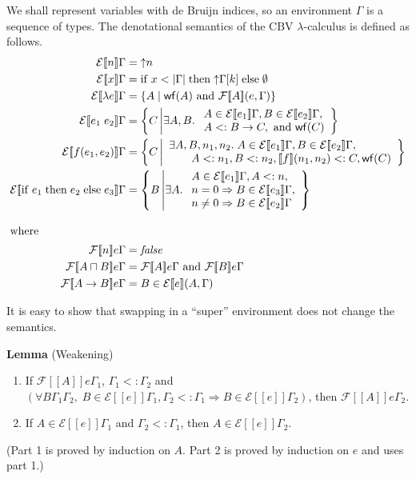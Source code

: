 \documentclass{article}
\newcommand{\app}[0]{\;}
\newcommand{\IF}[0]{\mathrm{if}\;}
\newcommand{\THEN}[0]{\;\mathrm{then}\;}
\newcommand{\ELSE}[0]{\;\mathrm{else}\;}
\newcommand{\SEM}[1]{[\![ #1 ]\!]}
\newcommand{\ESEM}[1]{\mathcal{E}\SEM{#1}}
\newcommand{\FSEM}[1]{\mathcal{F}\SEM{#1}}
\newcommand{\WF}[1]{\mathsf{wf}(#1)}
\newcommand{\UP}[1]{\mathord{\uparrow} #1}
\begin{document}
We shall represent variables with de Bruijn indices, so an environment
$\Gamma$ is a sequence of types.  The denotational semantics of the CBV
$\lambda$-calculus is defined as follows.
\begin{align*}
  \ESEM{n}\Gamma &= \UP{n} \\
  \ESEM{x}\Gamma &=  \IF x < |\Gamma| \THEN \UP{\Gamma[k]} \ELSE \emptyset \\
  \ESEM{\lambda e }\Gamma &= \{ A \mid \WF{A} \text{ and } \FSEM{A}(e,\Gamma) \} \\
  \ESEM{e_1\app e_2}\Gamma &= \left\{ C\, \middle| \exists A,B.\;
      \begin{array}{l}
      A \in \ESEM{e_1}\Gamma,
      B \in \ESEM{e_2}\Gamma,\\
      A <: B \to C, \text{ and } \WF{C}
      \end{array}
        \right\} \\
  \ESEM{f(e_1,e_2)}\Gamma &=
      \left\{ C\, \middle| \begin{array}{l}
       \exists A,B,n_1,n_2.\; A \in \ESEM{e_1}\Gamma, B \in \ESEM{e_2}\Gamma,\\
      \qquad A <: n_1, B <: n_2, \SEM{f}(n_1,n_2) <: C, \WF{C} 
      \end{array} \right\} \\
  \ESEM{\IF e_1 \THEN e_2 \ELSE e_3}\Gamma &=
    \left\{ B\, \middle| \exists A.\;
    \begin{array}{l}A \in \ESEM{e_1}\Gamma, A <: n,\\
           n = 0 \Rightarrow B \in \ESEM{e_3}\Gamma,\\
           n \neq 0 \Rightarrow B \in \ESEM{e_2}\Gamma
    \end{array}
    \right\}
    \\[2ex]
    \intertext{where}
   \FSEM{n}e\Gamma &= \mathit{false} \\
   \FSEM{A \sqcap B}e \Gamma &= \FSEM{A}e\Gamma \text{ and } \FSEM{B}e\Gamma\\
   \FSEM{A \to B}e \Gamma &= B \in \ESEM{e} (A, \Gamma)
\end{align*}

It is easy to show that swapping in a ``super'' environment does not
change the semantics.

\noindent \textbf{Lemma} (Weakening)
\begin{enumerate}
\item If $\FSEM{A}e \Gamma_1$, $\Gamma_1 <: \Gamma_2$ and
  $(\forall B \Gamma_1 \Gamma_2,\; B \in \ESEM{e}\Gamma_1, \Gamma_2 <: \Gamma_1
  \Rightarrow B \in \ESEM{e}\Gamma_2)$, then
  $\FSEM{A}e \Gamma_2$.
\item If $A \in \ESEM{e}\Gamma_1$ and $\Gamma_2 <: \Gamma_1$,
  then $A \in \ESEM{e}\Gamma_2$.
\end{enumerate}
(Part 1 is proved by induction on $A$. Part 2 is proved by induction
on $e$ and uses part 1.) \\
\end{document}
